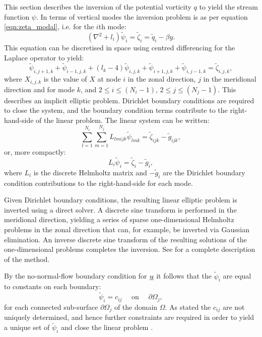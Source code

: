 \documentclass[a4paper]{book}
\begin{document}
This section describes the inversion of the potential vorticity $q$ to yield the
stream function $\psi$. In terms of vertical modes the inversion problem is as
per equation \eqref{eqn:zeta_modal}, i.e. for the $i$th mode:
\begin{equation}
   \left( \nabla^2 + l_i \right) \tilde{\psi}_i = \tilde{\zeta}_i = \tilde{q}_i - \beta y.
\end{equation}
This equation can be discretised in space using centred differencing for the
Laplace operator to yield:
\begin{equation}\label{eqn:zeta_modal_discrete}
  \tilde{\psi}_{i,j + 1,k} + \tilde{\psi}_{i - 1,j,k} + \left( l_k - 4 \right) \tilde{\psi}_{i,j,k} + \tilde{\psi}_{i + 1,j,k} + \tilde{\psi}_{i,j - 1,k} = \tilde{\zeta}_{i,j,k},
\end{equation}
where $X_{i,j,k}$ is the value of $X$ at node $i$ in the zonal direction,
$j$ in the meridional direction and for mode $k$, and
$2 \leq i \leq \left( N_i - 1 \right)$, $2 \leq j \leq \left( N_j - 1 \right)$.
This describes an implicit elliptic problem. Dirichlet boundary conditions are
required to close the system, and the boundary condition terms contribute to the
right-hand-side of the linear problem. The linear system can be written:
\begin{equation}
  \sum_{l = 1}^{N_i} \sum_{m = 1}^{N_j} L_{lmijk} \tilde{\psi}_{lmk} = \tilde{\zeta}_{ijk} - \tilde{g}_{ijk},
\end{equation}
or, more compactly:
\begin{equation}
  L_i \tilde{\psi}_i = \tilde{\zeta}_i - \tilde{g}_i,
\end{equation}
where $L_i$ is the discrete Helmholtz matrix and $-\tilde{g}_i$ are the
Dirichlet boundary condition contributions to the right-hand-side for each mode.

Given Dirichlet boundary conditions, the resulting linear elliptic problem is
inverted using a direct solver. A discrete sine transform is performed in the
meridional direction, yielding a series of sparse one-dimensional Helmholtz
problems in the zonal direction that can, for example, be inverted via Gaussian
elimination. An inverse discrete sine transform of the resulting solutions of
the one-dimensional problems completes the inversion. See \citet{hogg2006} for a complete
description of the method.

By the no-normal-flow boundary condition for $\uline{u}$ it follows that the
$\tilde{\psi}_i$ are equal to constants on each boundary:
\begin{equation}
  \tilde{\psi}_i = c_{ij} \quad \textrm{ on } \quad \partial \Omega_j,
\end{equation}
for each connected sub-surface $\partial \Omega_j$ of the domain $\Omega$. As stated the
$c_{ij}$ are not uniquely determined, and hence further constraints are required
in order to yield a unique set of $\tilde{\psi}_i$ and close the linear
problem \citep{mcwilliams1977}.
\end{document}
